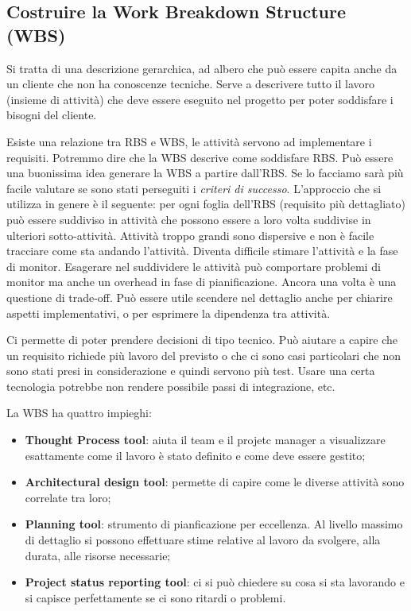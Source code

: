 \subsection{Costruire la Work Breakdown Structure (WBS)}
Si tratta di una descrizione gerarchica, ad albero che può essere capita anche da un cliente che non ha conoscenze tecniche.
Serve a descrivere tutto il lavoro (insieme di attività) che deve essere eseguito nel progetto per poter soddisfare i bisogni del cliente.

\noindent Esiste una relazione tra RBS e WBS, le attività servono ad implementare i requisiti. Potremmo dire che la WBS descrive come soddisfare RBS. Può essere una buonissima idea generare la WBS a partire dall'RBS. Se lo facciamo sarà più facile valutare se sono stati perseguiti i \textit{criteri di successo}.\newline
\noindent L'approccio che si utilizza in genere è il seguente: per ogni foglia dell'RBS (requisito più dettagliato) può essere suddiviso in attività che possono essere a loro volta suddivise in ulteriori sotto-attività. Attività troppo grandi sono dispersive e non è facile tracciare come sta andando l'attività. Diventa difficile stimare l'attività e la fase di monitor.\newline
Esagerare nel suddividere le attività può comportare problemi di monitor ma anche un overhead in fase di pianificazione. Ancora una volta è una questione di trade-off. Può essere utile scendere nel dettaglio anche per chiarire aspetti implementativi, o per esprimere la dipendenza tra attività.

\begin{info}
	Ci permette di poter prendere decisioni di tipo tecnico. Può aiutare a capire che un requisito richiede più lavoro del previsto o che ci sono casi particolari che non sono stati presi in considerazione e quindi servono più test. Usare una certa tecnologia potrebbe non rendere possibile passi di integrazione, etc.
\end{info}

\noindent La WBS ha quattro impieghi:
\begin{itemize}
	\item \textbf{Thought Process tool}: aiuta il team e il projetc manager a visualizzare esattamente come il lavoro è stato definito e come deve essere gestito;
	\item \textbf{Architectural design tool}: permette di capire come le diverse attività sono correlate tra loro;
	\item \textbf{Planning tool}: strumento di pianficazione per eccellenza. Al livello massimo di dettaglio si possono effettuare stime relative al lavoro da svolgere, alla durata, alle risorse necessarie;
	\item \textbf{Project status reporting tool}: ci si può chiedere su cosa si sta lavorando e si capisce perfettamente se ci sono ritardi o problemi.
\end{itemize}

